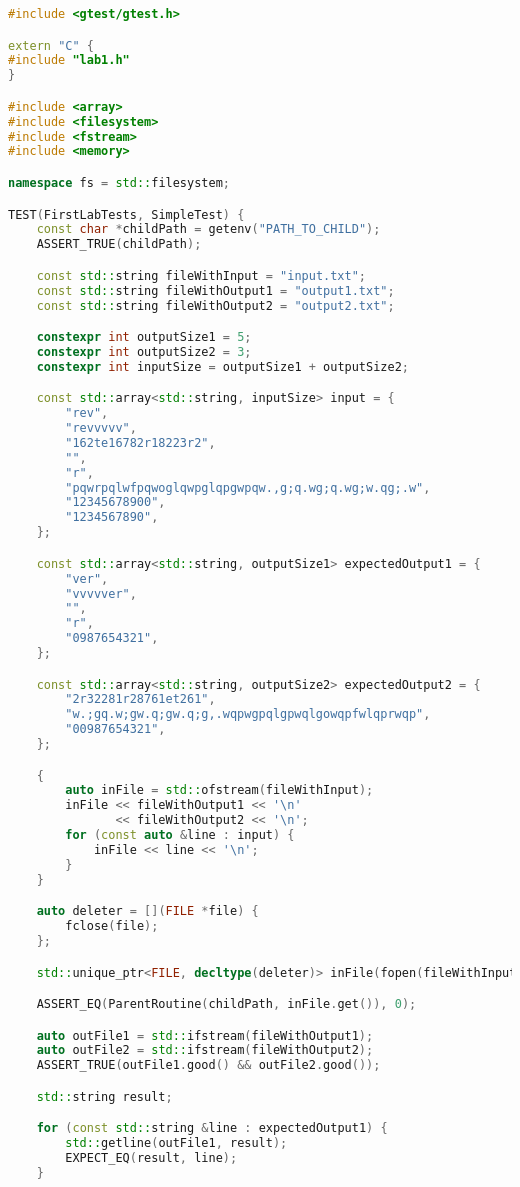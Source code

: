 \documentclass[a4paper, 12pt]{article}
\begin{document}
\begin{lstlisting}[language=C++]
#include <gtest/gtest.h>

extern "C" {
#include "lab1.h"
}

#include <array>
#include <filesystem>
#include <fstream>
#include <memory>

namespace fs = std::filesystem;

TEST(FirstLabTests, SimpleTest) {
    const char *childPath = getenv("PATH_TO_CHILD");
    ASSERT_TRUE(childPath);

    const std::string fileWithInput = "input.txt";
    const std::string fileWithOutput1 = "output1.txt";
    const std::string fileWithOutput2 = "output2.txt";

    constexpr int outputSize1 = 5;
    constexpr int outputSize2 = 3;
    constexpr int inputSize = outputSize1 + outputSize2;

    const std::array<std::string, inputSize> input = {
        "rev",
        "revvvvv",
        "162te16782r18223r2",
        "",
        "r",
        "pqwrpqlwfpqwoglqwpglqpgwpqw.,g;q.wg;q.wg;w.qg;.w",
        "12345678900",
        "1234567890",
    };

    const std::array<std::string, outputSize1> expectedOutput1 = {
        "ver",
        "vvvvver",
        "",
        "r",
        "0987654321",
    };

    const std::array<std::string, outputSize2> expectedOutput2 = {
        "2r32281r28761et261",
        "w.;gq.w;gw.q;gw.q;g,.wqpwgpqlgpwqlgowqpfwlqprwqp",
        "00987654321",
    };

    {
        auto inFile = std::ofstream(fileWithInput);
        inFile << fileWithOutput1 << '\n'
               << fileWithOutput2 << '\n';
        for (const auto &line : input) {
            inFile << line << '\n';
        }
    }

    auto deleter = [](FILE *file) {
        fclose(file);
    };

    std::unique_ptr<FILE, decltype(deleter)> inFile(fopen(fileWithInput.c_str(), "r"), deleter);

    ASSERT_EQ(ParentRoutine(childPath, inFile.get()), 0);

    auto outFile1 = std::ifstream(fileWithOutput1);
    auto outFile2 = std::ifstream(fileWithOutput2);
    ASSERT_TRUE(outFile1.good() && outFile2.good());

    std::string result;

    for (const std::string &line : expectedOutput1) {
        std::getline(outFile1, result);
        EXPECT_EQ(result, line);
    }


\end{lstlisting}
\end{document}
